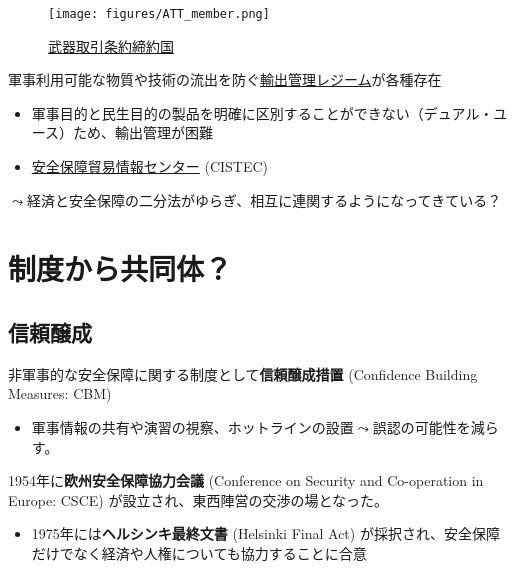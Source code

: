 \documentclass[
  xelatex,
  ja=standard]{bxjsarticle}
\providecommand{\tightlist}{%
  \setlength{\itemsep}{0pt}\setlength{\parskip}{0pt}}\usepackage{longtable,booktabs,array}
\begin{document}
\begin{figure}[htpb]

{\centering \texttt{[image: figures/ATT\_member.png]}

}

\caption{\href{https://commons.wikimedia.org/wiki/File:Arms_Trade_Treaty_status.svg}{武器取引条約締約国}}

\end{figure}

軍事利用可能な物質や技術の流出を防ぐ\href{https://www.mofa.go.jp/mofaj/gaiko/regime/index.html}{輸出管理レジーム}が各種存在

\begin{itemize}
\tightlist
\item
  軍事目的と民生目的の製品を明確に区別することができない（デュアル・ユース）ため、輸出管理が困難
\item
  \href{https://www.cistec.or.jp/export/yukan_kiso/index.html}{安全保障貿易情報センター}
  (CISTEC)
\end{itemize}

\(\leadsto\)経済と安全保障の二分法がゆらぎ、相互に連関するようになってきている？

\hypertarget{ux5236ux5ea6ux304bux3089ux5171ux540cux4f53}{%
\section{制度から共同体？}\label{ux5236ux5ea6ux304bux3089ux5171ux540cux4f53}}

\hypertarget{ux4fe1ux983cux91b8ux6210}{%
\subsection{信頼醸成}\label{ux4fe1ux983cux91b8ux6210}}

非軍事的な安全保障に関する制度として\textbf{信頼醸成措置} (Confidence
Building Measures: CBM)

\begin{itemize}
\tightlist
\item
  軍事情報の共有や演習の視察、ホットラインの設置\(\leadsto\)誤認の可能性を減らす。
\end{itemize}

1954年に\textbf{欧州安全保障協力会議} (Conference on Security and
Co-operation in Europe: CSCE) が設立され、東西陣営の交渉の場となった。

\begin{itemize}
\tightlist
\item
  1975年には\textbf{ヘルシンキ最終文書} (Helsinki Final Act)
  が採択され、安全保障だけでなく経済や人権についても協力することに合意
\end{itemize}
\end{document}
